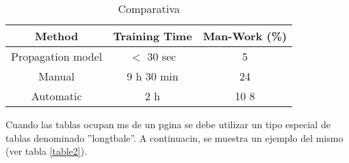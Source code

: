 \begin{table}
  \renewcommand{\arraystretch}{1.3}
  \caption{Comparativa}
  \label{table1}
  \begin{center}
    \begin{tabular}{|c|c|c|}
      \hline
      Method & Training Time & Man-Work (\%)\\
      \hline
      Propagation model & $<$ 30 sec & 5\\
      \hline
      Manual & 9 h 30 min & 24\\
      \hline
      Automatic & 2 h & 10 8\\
      \hline
    \end{tabular}
  \end{center}
\end{table}

Cuando las tablas ocupan ms de un pgina se debe utilizar un tipo especial de tablas denominado ''longtbale''. A continuacin, se muestra un ejemplo del mismo (ver tabla \ref{table2}).

